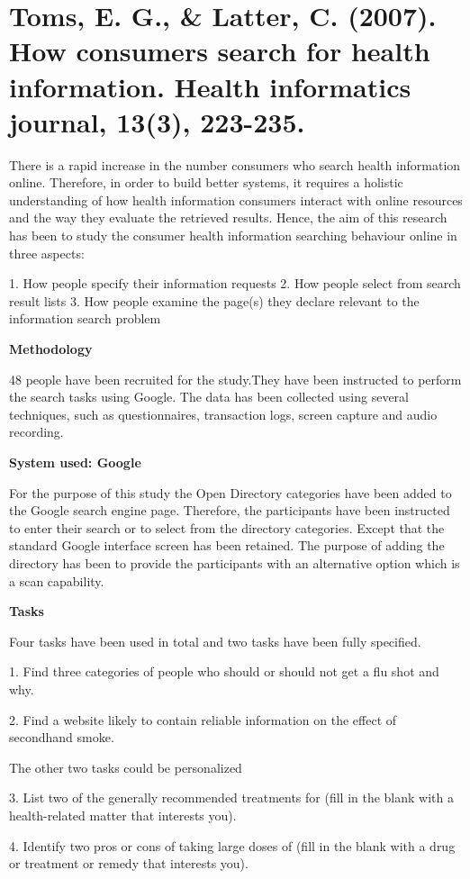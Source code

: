\documentclass[]{article}
\begin{document}
\section{Toms, E. G., \& Latter, C. (2007). How consumers search for health information. Health informatics journal, 13(3), 223-235.}

There is a rapid increase in the number consumers who search health information online. Therefore, in order to build better systems, it requires a holistic understanding of how health information consumers interact with online resources and the way they evaluate the retrieved results. Hence, the aim of this research has been to study the consumer health information searching  behaviour online in three aspects:

1. How people specify their information requests 
2. How people select from search result lists
3. How people examine the page(s) they declare relevant to the information search problem

\textbf{Methodology}

48 people have been recruited for the study.They have been instructed to perform the search tasks using Google. The data has been collected using several techniques, such as questionnaires,
transaction logs, screen capture and audio recording.  

\textbf{System used: Google}

For the purpose of this study the Open Directory categories have been added to the Google search engine page. Therefore, the participants have been instructed to enter their search or to select from the directory categories. Except that the standard Google interface screen has been retained. The purpose of adding the directory has been to provide the participants with an alternative option which is a scan capability.    

\textbf{Tasks}

Four tasks have been used in total and two tasks have been fully specified.

1. Find three categories of people who should or should not get a flu shot and why.

2. Find a website likely to contain reliable information on the effect of secondhand smoke.

The other two tasks could be personalized

3. List two of the generally recommended treatments for (fill in the blank with a health-related matter that interests you).

4. Identify two pros or cons of taking large doses of (fill in the blank with a drug or treatment or remedy that interests you). 
\end{document}

